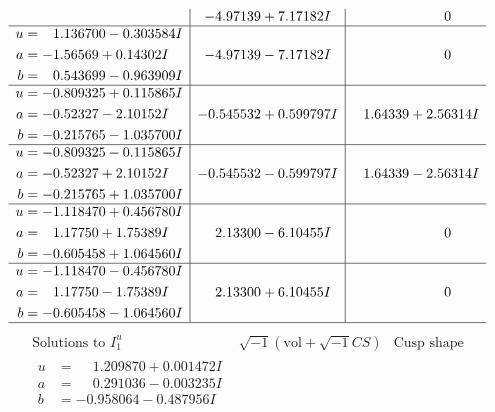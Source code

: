\documentclass[1p]{elsarticle_modified}
\theoremstyle{definition}
\newcommand{\I}{\sqrt{-1}}
\begin{document}
$$\begin{array}{c|c|c}
 & -4.97139 + 7.17182 I & \phantom{-0.000000 } 0 \\ \hline\begin{aligned}
u &= \phantom{-}1.136700 - 0.303584 I \\
a &= -1.56569 + 0.14302 I \\
b &= \phantom{-}0.543699 - 0.963909 I\end{aligned}
 & -4.97139 - 7.17182 I & \phantom{-0.000000 } 0 \\ \hline\begin{aligned}
u &= -0.809325 + 0.115865 I \\
a &= -0.52327 - 2.10152 I \\
b &= -0.215765 - 1.035700 I\end{aligned}
 & -0.545532 + 0.599797 I & \phantom{-}1.64339 + 2.56314 I \\ \hline\begin{aligned}
u &= -0.809325 - 0.115865 I \\
a &= -0.52327 + 2.10152 I \\
b &= -0.215765 + 1.035700 I\end{aligned}
 & -0.545532 - 0.599797 I & \phantom{-}1.64339 - 2.56314 I \\ \hline\begin{aligned}
u &= -1.118470 + 0.456780 I \\
a &= \phantom{-}1.17750 + 1.75389 I \\
b &= -0.605458 + 1.064560 I\end{aligned}
 & \phantom{-}2.13300 - 6.10455 I & \phantom{-0.000000 } 0 \\ \hline\begin{aligned}
u &= -1.118470 - 0.456780 I \\
a &= \phantom{-}1.17750 - 1.75389 I \\
b &= -0.605458 - 1.064560 I\end{aligned}
 & \phantom{-}2.13300 + 6.10455 I & \phantom{-0.000000 } 0\\
 \hline 
 \end{array}$$\newpage$$\begin{array}{c|c|c}  
\text{Solutions to }I^u_{1}& \I (\text{vol} + \sqrt{-1}CS) & \text{Cusp shape}\\
 \hline 
\begin{aligned}
u &= \phantom{-}1.209870 + 0.001472 I \\
a &= \phantom{-}0.291036 - 0.003235 I \\
b &= -0.958064 - 0.487956 I\end{aligned}

\end{array}$$
\end{document}
